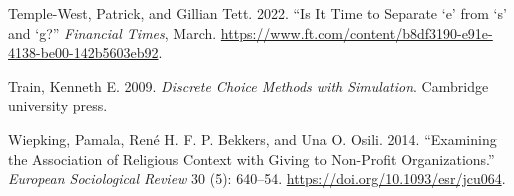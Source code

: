 \documentclass[
  12pt,
]{article}
\newlength{\cslhangindent}
\newlength{\cslentryspacingunit} %
\newenvironment{CSLReferences}[2] %
 {%
  \setlength{\parindent}{0pt}
  \ifodd #1
  \let\oldpar\par
  \def\par{\hangindent=\cslhangindent\oldpar}
  \fi
  \setlength{\parskip}{#2\cslentryspacingunit}
 }%
 {}
\begin{document}
\begin{CSLReferences}{1}{0}
\leavevmode{}%
Temple-West, Patrick, and Gillian Tett. 2022. {``Is It Time to Separate {`}e{'} from {`}s{'} and {`}g?''} \emph{Financial Times}, March. \url{https://www.ft.com/content/b8df3190-e91e-4138-be00-142b5603eb92}.

\leavevmode{}%
Train, Kenneth E. 2009. \emph{Discrete Choice Methods with Simulation}. Cambridge university press.

\leavevmode{}%
Wiepking, Pamala, René H. F. P. Bekkers, and Una O. Osili. 2014. {``Examining the Association of Religious Context with Giving to Non-Profit Organizations.''} \emph{European Sociological Review} 30 (5): 640--54. \url{https://doi.org/10.1093/esr/jcu064}.

\end{CSLReferences}
\end{document}

